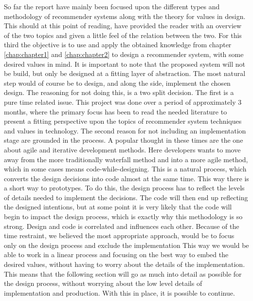 So far the report have mainly been focused upon the different types and methodology of recommender systems along with the theory for values in design. This should at this point of reading, have provided the reader with an overview of the two topics and given a little feel of the relation between the two. For this third the objective is to use and apply the obtained knowledge from chapter \ref{chap:chapter1} and \ref{chap:chapter2} to design a recommender system, with some desired values in mind. It is important to note that the proposed system will not be build, but only be designed at a fitting layer of abstraction. The most natural step would of course be to design, and along the side, implement the chosen design. The reasoning for not doing this, is a two split decision. The first is a pure time related issue. This project was done over a period of approximately 3 months, where the primary focus has been to read the needed literature to present a fitting perspective upon the topics of recommender system techniques and values in technology. The second reason for not including an implementation stage are grounded in the process. A popular thought in these times are the one about agile and iterative development methods. Here developers wants to move away from the more traditionally waterfall method and into a more agile method, which in some cases means code-while-designing. This is a natural process, which converts the design decisions into code almost at the same time. This way there is a short way to prototypes. To do this, the design process has to reflect the levels of details needed to implement the decisions. The code will then end up reflecting the designed intentions, but at some point it is very likely that the code will begin to impact the design process, which is exactly why this methodology is so strong. Design and code is correlated and influences each other. Because of the time restraint, we believed the most appropriate approach, would be to focus only on the design process and exclude the implementation This way we would be able to work in a linear process and focusing on the best way to embed the desired values, without having to worry about the details of the implementation.\\
This means that the following section will go as much into detail as possible for the design process, without worrying about the low level details of implementation and production. With this in place, it is possible to continue. 


